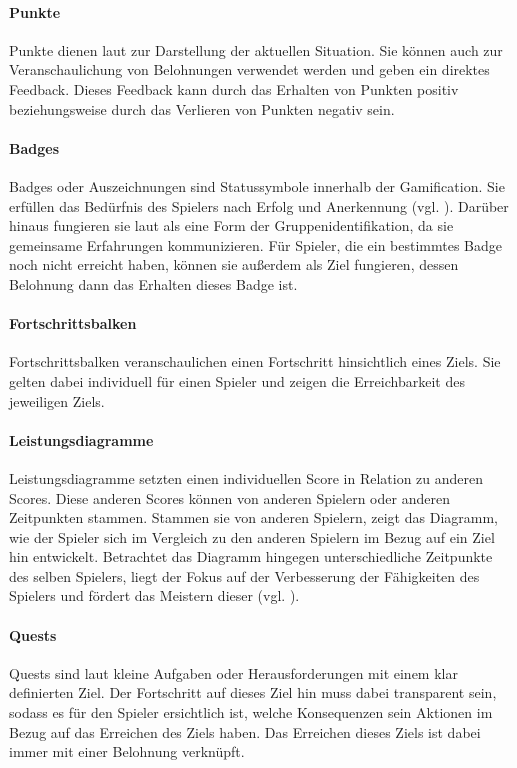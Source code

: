 \documentclass[
	oneside,  %
	ngerman, 
	final, 
	11pt, 
	a4paper, 
	1.1headlines, 
	headinclude=false, 
	footinclude=false, 
	mpinclude=false, 
	pagesize, 
	onecolumn, 
	titlepage, 
	parskip=half, 
	headsepline, 
	chapterprefix=false, 
	version=first, 
	listof=totoc, 
	bibliography=totoc, 
	toc=graduated, 
	fleqn
]{scrbook}
\begin{document}
\paragraph{Punkte}
Punkte dienen laut \cite{SH2014} zur Darstellung der aktuellen Situation.
Sie können auch zur Veranschaulichung von Belohnungen verwendet werden und geben ein direktes Feedback.
Dieses Feedback kann durch das Erhalten von Punkten positiv beziehungsweise durch das Verlieren von Punkten negativ sein.

\paragraph{Badges}
Badges oder Auszeichnungen sind Statussymbole innerhalb der Gamification.
Sie erfüllen das Bedürfnis des Spielers nach Erfolg und Anerkennung (vgl. \cite{SH2014}).
Darüber hinaus fungieren sie laut \cite{SH2014} als eine Form der Gruppenidentifikation, da sie gemeinsame Erfahrungen kommunizieren.
Für Spieler, die ein bestimmtes Badge noch nicht erreicht haben, können sie außerdem als Ziel fungieren, dessen Belohnung dann das Erhalten dieses Badge ist.

\paragraph{Fortschrittsbalken}
Fortschrittsbalken veranschaulichen einen Fortschritt hinsichtlich eines Ziels.
Sie gelten dabei individuell für einen Spieler und zeigen die Erreichbarkeit des jeweiligen Ziels.

\paragraph{Leistungsdiagramme}
Leistungsdiagramme setzten einen individuellen Score in Relation zu anderen Scores.
Diese anderen Scores können von anderen Spielern oder anderen Zeitpunkten stammen.
Stammen sie von anderen Spielern, zeigt das Diagramm, wie der Spieler sich im Vergleich zu den anderen Spielern im Bezug auf ein Ziel hin entwickelt.
Betrachtet das Diagramm hingegen unterschiedliche Zeitpunkte des selben Spielers, liegt der Fokus auf der Verbesserung der Fähigkeiten des Spielers und fördert das Meistern dieser (vgl. \cite{SH2014}). 

\paragraph{Quests}
Quests sind laut \cite{SH2014} kleine Aufgaben oder Herausforderungen mit einem klar definierten Ziel.
Der Fortschritt auf dieses Ziel hin muss dabei transparent sein, sodass es für den Spieler ersichtlich ist, welche Konsequenzen sein Aktionen im Bezug auf das Erreichen des Ziels haben.
Das Erreichen dieses Ziels ist dabei immer mit einer Belohnung verknüpft.
\end{document}
